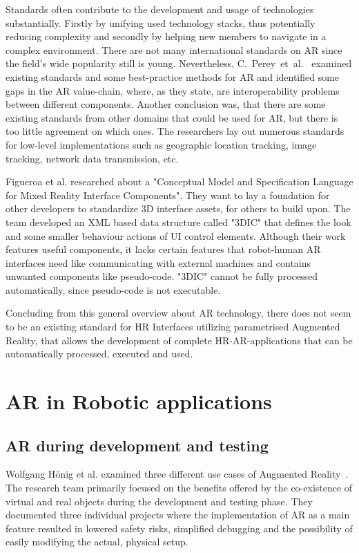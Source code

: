 Standards often contribute to the development and usage of technologies substantially. Firstly by unifying used technology stacks, thus potentially reducing complexity and secondly by helping new members to navigate in a complex environment. There are not many international standards on AR since the field's wide popularity still is young. Nevertheless, C.~Perey~et~al.~\cite{perey2011current} examined existing standards and some best-practice methods for AR and identified some gaps in the AR value-chain, where, as they state, are interoperability problems between different components. Another conclusion was, that there are some existing standards from other domains that could be used for AR, but there is too little agreement on which ones. The researchers lay out numerous standards for low-level implementations such as geographic location tracking, image tracking, network data transmission, etc.

Figueroa et al. \cite{figueroa2006conceptual} researched about a "Conceptual Model and Specification Language for Mixed Reality Interface Components". They want to lay a foundation for other developers to standardize 3D interface assets, for others to build upon. The team developed an XML based data structure called "3DIC" that defines the look and some smaller behaviour actions of UI control elements. Although their work features useful components, it lacks certain features that robot-human AR interfaces need like communicating with external machines and contains unwanted components like pseudo-code. "3DIC" cannot be fully processed automatically, since pseudo-code is not executable. 

Concluding from this general overview about AR technology, there does not seem to be an existing standard for HR Interfaces utilizing parametrised Augmented Reality, that allows the development of complete HR-AR-applications that can be automatically processed, executed and used. 

\section{AR in Robotic applications}
\subsection{AR during development and testing}
Wolfgang Hönig et al. examined three different use cases of Augmented Reality~\cite{hoenig2015mixed}. The research team primarily focused on the benefits offered by the co-existence of virtual and real objects during the development and testing phase. They documented three individual projects where the implementation of AR as a main feature resulted in lowered safety risks, simplified debugging and the possibility of easily modifying the actual, physical setup.

